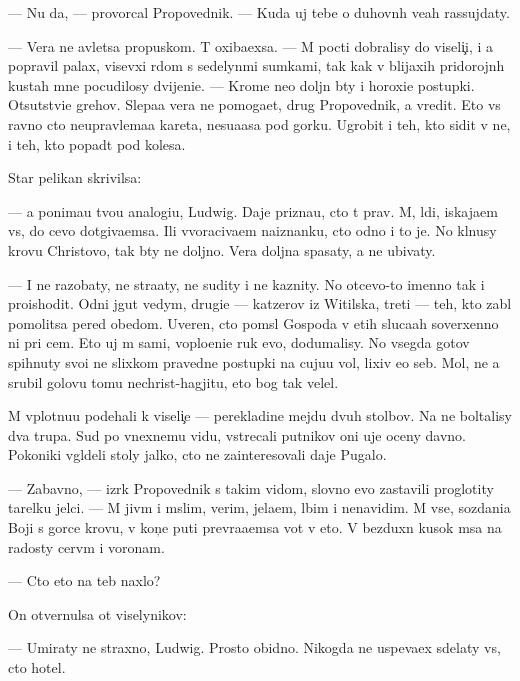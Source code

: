 \documentclass[10pt]{book}
\begin{document}
— Nu da, — provorcal Propovednik. — Kuda uj tebe o duhovn{\yi}h ve{\x}ah rassujdaty.

— Vera ne {\y}avl{\ia}{\y}etsa propuskom. T{\yi} oxiba{\y}exsa. — M{\yi} pocti dobralisy do viseli{\c}i, i {\y}a popravil palax, visevxi{\y} r{\ia}dom s sedelyn{\yi}mi sumkami, tak kak v blija{\y}xih pridorojn{\yi}h kustah mne pocudilosy dvijeni{\y}e. — Krome ne{\y}o doljn{\yi} b{\yi}ty i horoxi{\y}e postupki. Otsutstvi{\y}e grehov. Slepa{\y}a vera ne pomoga{\y}et, drug Propovednik, a vredit. Eto vs{\e} ravno cto neupravl{\ia}{\y}ema{\y}a kareta, nesu{\x}a{\y}asa pod gorku. Ugrobit i teh, kto sidit v ne{\y}, i teh, kto popad{\e}t pod kolesa.

Star{\yi}{\y} pelikan skrivilsa:

— {\Y}a ponima{\y}u tvo{\y}u analogi{\y}u, Ludwig. Daje prizna{\y}u, cto t{\yi} prav. M{\yi}, l{\iu}di, iskaja{\y}em vs{\e}, do cevo dot{\ia}giva{\y}emsa. Ili v{\yi}voraciva{\y}em naiznanku, cto odno i to je. No kl{\ia}nusy krov{\y}u Christovo{\y}, tak b{\yi}ty ne doljno. Vera doljna spasaty, a ne ubivaty.

— I ne razob{\x}aty, ne stra{\x}aty, ne sudity i ne kaznity. No otcevo-to imenno tak i proishodit. Odni jgut vedym, drugi{\y}e — katzerov iz Witilska, tret{\yf}i — teh, kto zab{\yi}l pomolitsa pered obedom. Uveren, cto pom{\yi}sl{\yi} Gospoda v etih sluca{\y}ah soverxenno ni pri cem. Eto uj m{\yi} sami, voplo{\x}eni{\y}e ruk {\y}evo, dodumalisy. No vsegda gotov{\yi} spihnuty svo{\y}i ne slixkom pravedn{\yi}{\y}e postupki na cuju{\y}u vol{\iu}, lixiv {\y}e{\y}o seb{\ia}. Mol, ne {\y}a srubil golovu tomu nechrist{\iu}-hagjitu, eto bog tak velel.

M{\yi} vplotnu{\y}u pod{\y}ehali k viseli{\c}e — perekladine mejdu dvuh stolbov. Na ne{\y} boltalisy dva trupa. Sud{\ia} po vnexnemu vidu, vstrecali putnikov oni uje oceny davno. Poko{\y}niki v{\yi}gl{\ia}deli stoly jalko, cto ne zainteresovali daje Pugalo.

— Zabavno, — izr{\e}k Propovednik s takim vidom, slovno {\y}evo zastavili proglotity tarelku jelci. — M{\yi} jiv{\e}m i m{\yi}slim, verim, jela{\y}em, l{\iu}bim i nenavidim. M{\yi} vse, sozdani{\y}a Boj{\yf}i s gor{\ia}ce{\y} krov{\y}u, v kon{\c}e puti prevra{\x}a{\y}emsa vot v eto. V bezduxn{\yi}{\y} kusok m{\ia}sa na radosty cerv{\ia}m i voronam.

— Cto eto na teb{\ia} naxlo?

On otvernulsa ot viselynikov:

— Umiraty ne straxno, Ludwig. Prosto obidno. Nikogda ne uspeva{\y}ex sdelaty vs{\e}, cto hotel.
\end{document}
